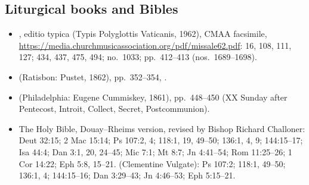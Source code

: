 {\scriptsize
\subsection*{Liturgical books and Bibles}
\begin{itemize}\setlength{\itemsep}{0.15em}\setlength{\parskip}{0pt}
\item {}, editio typica (Typis Polyglottis Vaticanis, 1962), CMAA facsimile, \url{https://media.churchmusicassociation.org/pdf/missale62.pdf}:  16, 108, 111, 127;  434, 437, 475, 494;  no.~1033; pp.~412--413 (nos.~1689--1698).
\item {} (Ratisbon: Pustet, 1862), pp.~352--354, .
\item {} (Philadelphia: Eugene Cummiskey, 1861), pp.~448--450 (XX Sunday after Pentecost, Introit, Collect, Secret, Postcommunion).
\item The Holy Bible, Douay--Rheims version, revised by Bishop Richard Challoner: Deut 32:15; 2 Mac 15:14; Ps 107:2, 4; 118:1, 19, 49--50; 136:1, 4, 9; 144:15--17; Isa 44:4; Dan 3:1, 20, 24--45; Mic 7:1; Mt 8:7; Jn 4:41--54; Rom 11:25--26; 1 Cor 14:22; Eph 5:8, 15--21.  (Clementine Vulgate): Ps 107:2; 118:1, 49--50; 136:1, 4; 144:15--16; Dan 3:29--43; Jn 4:46--53; Eph 5:15--21.
\end{itemize}

}
